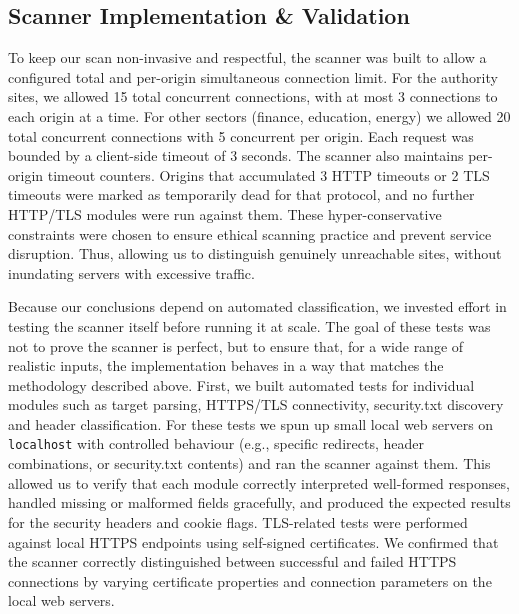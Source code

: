 \documentclass[pdflatex,sn-mathphys-num]{sn-jnl}
\numberwithin{equation}{section}
\theoremstyle{thmstyleone}
\theoremstyle{thmstyletwo}%
\theoremstyle{thmstylethree}%
\begin{document}
\subsection{Scanner Implementation \& Validation}

\vspace{1em}To keep our scan non-invasive and respectful, the scanner was built to allow a configured 
total and per-origin simultaneous connection limit. 
For the authority sites, we allowed 15 total concurrent connections, with at most 
3 connections to each origin at a time. For other sectors (finance, education, energy) 
we allowed 20 total concurrent connections with 5 concurrent per origin. Each request was bounded by a client-side timeout of 3 seconds. 
The scanner also maintains per-origin timeout counters.
Origins that accumulated 3 HTTP timeouts or 2 TLS timeouts were marked as temporarily dead for that protocol, 
and no further HTTP/TLS modules were run against them. These hyper-conservative constraints were chosen to ensure ethical scanning practice 
and prevent service disruption. Thus, allowing us to distinguish genuinely unreachable sites, 
without inundating servers with excessive traffic.


\vspace{1em}Because our conclusions depend on automated classification, we invested effort in testing the scanner 
itself
before running it at scale. The goal of these tests was not to prove the scanner is perfect, but to ensure that, 
for a wide range of realistic inputs, the implementation behaves in a way that matches the methodology described above.
First, we built automated tests for individual modules such as target parsing, HTTPS/TLS connectivity, security.txt 
discovery and 
header classification. For these tests we spun up small local web servers on \texttt{localhost} with controlled behaviour
 (e.g., specific redirects, header combinations, or security.txt contents) and ran the scanner against them. This 
allowed us to verify that each module correctly interpreted well-formed responses, handled missing or malformed fields 
gracefully, 
and produced the expected results for the security headers and cookie flags. 
TLS-related tests were performed against local HTTPS endpoints using self-signed certificates. 
We confirmed that the scanner correctly distinguished between successful and failed HTTPS connections by 
varying certificate properties and connection parameters on the local web servers. 
\end{document}

